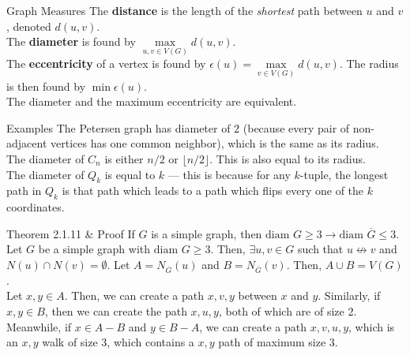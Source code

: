 \documentclass[10pt]{extarticle}
\begin{document}
\begin{problem}{Graph Measures}
  The \textbf{distance} is the length of the \textit{shortest} path between $u$ and $v$, denoted $d(u,v)$.\\

  The \textbf{diameter} is found by $\max\limits_{u,v\in V(G)}d(u,v)$.\\

  The \textbf{eccentricity} of a vertex is found by $\epsilon(u) = \max\limits_{v\in V(G)}d(u,v)$. The radius is then found by $\min \epsilon(u)$. \\

  The diameter and the maximum eccentricity are equivalent.
\end{problem}
\begin{problem}{Examples}
  The Petersen graph has diameter of $2$ (because every pair of non-adjacent vertices has one common neighbor), which is the same as its radius.\\

  The diameter of $C_n$ is either $n/2$ or $\lfloor n/2 \rfloor$. This is also equal to its radius.\\

  The diameter of $Q_k$ is equal to $k$ --- this is because for any $k$-tuple, the longest path in $Q_k$ is that path which leads to a path which flips every one of the $k$ coordinates.
\end{problem}
\begin{problem}{Theorem 2.1.11 \& Proof}
  If $G$ is a simple graph, then $\textrm{diam }G \geq 3 \rightarrow \textrm{diam }\overline{G} \leq 3$.
  \tcblower
  Let $G$ be a simple graph with $\textrm{diam }G \geq 3$. Then, $\exists u,v\in G$ such that $u\not\leftrightarrow v$ and $N(u)\cap N(v) = \emptyset$. Let $A = N_{\overline{G}}(u)$ and $B = N_{\overline{G}}(v)$. Then, $A\cup B = V(G)$.\\

  Let $x,y\in A$. Then, we can create a path $x,v,y$ between $x$ and $y$. Similarly, if $x,y\in B$, then we can create the path $x,u,y$, both of which are of size 2. Meanwhile, if $x\in A-B$ and $y\in B-A$, we can create a path $x,v,u,y$, which is an $x,y$ walk of size 3, which contains a $x,y$ path of maximum size $3$.
\end{problem}
\end{document}
